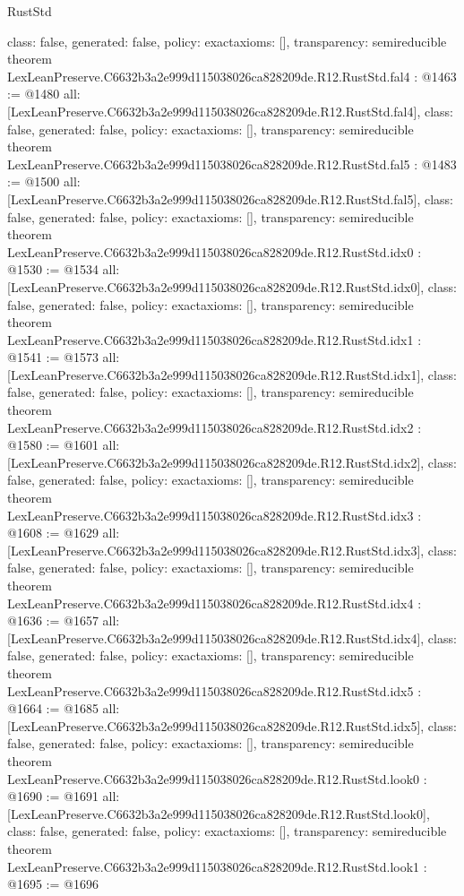 \begin{lexlean}{RustStd}
\begin{coremodule}
{  class: false,
  generated: false,
  policy: exact{axioms: []},
  transparency: semireducible
}
theorem LexLeanPreserve.C6632b3a2e999d115038026ca828209de.R12.RustStd.fal4 : @1463 := @1480 {
  all: [LexLeanPreserve.C6632b3a2e999d115038026ca828209de.R12.RustStd.fal4],
  class: false,
  generated: false,
  policy: exact{axioms: []},
  transparency: semireducible
}
theorem LexLeanPreserve.C6632b3a2e999d115038026ca828209de.R12.RustStd.fal5 : @1483 := @1500 {
  all: [LexLeanPreserve.C6632b3a2e999d115038026ca828209de.R12.RustStd.fal5],
  class: false,
  generated: false,
  policy: exact{axioms: []},
  transparency: semireducible
}
theorem LexLeanPreserve.C6632b3a2e999d115038026ca828209de.R12.RustStd.idx0 : @1530 := @1534 {
  all: [LexLeanPreserve.C6632b3a2e999d115038026ca828209de.R12.RustStd.idx0],
  class: false,
  generated: false,
  policy: exact{axioms: []},
  transparency: semireducible
}
theorem LexLeanPreserve.C6632b3a2e999d115038026ca828209de.R12.RustStd.idx1 : @1541 := @1573 {
  all: [LexLeanPreserve.C6632b3a2e999d115038026ca828209de.R12.RustStd.idx1],
  class: false,
  generated: false,
  policy: exact{axioms: []},
  transparency: semireducible
}
theorem LexLeanPreserve.C6632b3a2e999d115038026ca828209de.R12.RustStd.idx2 : @1580 := @1601 {
  all: [LexLeanPreserve.C6632b3a2e999d115038026ca828209de.R12.RustStd.idx2],
  class: false,
  generated: false,
  policy: exact{axioms: []},
  transparency: semireducible
}
theorem LexLeanPreserve.C6632b3a2e999d115038026ca828209de.R12.RustStd.idx3 : @1608 := @1629 {
  all: [LexLeanPreserve.C6632b3a2e999d115038026ca828209de.R12.RustStd.idx3],
  class: false,
  generated: false,
  policy: exact{axioms: []},
  transparency: semireducible
}
theorem LexLeanPreserve.C6632b3a2e999d115038026ca828209de.R12.RustStd.idx4 : @1636 := @1657 {
  all: [LexLeanPreserve.C6632b3a2e999d115038026ca828209de.R12.RustStd.idx4],
  class: false,
  generated: false,
  policy: exact{axioms: []},
  transparency: semireducible
}
theorem LexLeanPreserve.C6632b3a2e999d115038026ca828209de.R12.RustStd.idx5 : @1664 := @1685 {
  all: [LexLeanPreserve.C6632b3a2e999d115038026ca828209de.R12.RustStd.idx5],
  class: false,
  generated: false,
  policy: exact{axioms: []},
  transparency: semireducible
}
theorem LexLeanPreserve.C6632b3a2e999d115038026ca828209de.R12.RustStd.look0 : @1690 := @1691 {
  all: [LexLeanPreserve.C6632b3a2e999d115038026ca828209de.R12.RustStd.look0],
  class: false,
  generated: false,
  policy: exact{axioms: []},
  transparency: semireducible
}
theorem LexLeanPreserve.C6632b3a2e999d115038026ca828209de.R12.RustStd.look1 : @1695 := @1696 {
}
\end{coremodule}
\end{lexlean}
